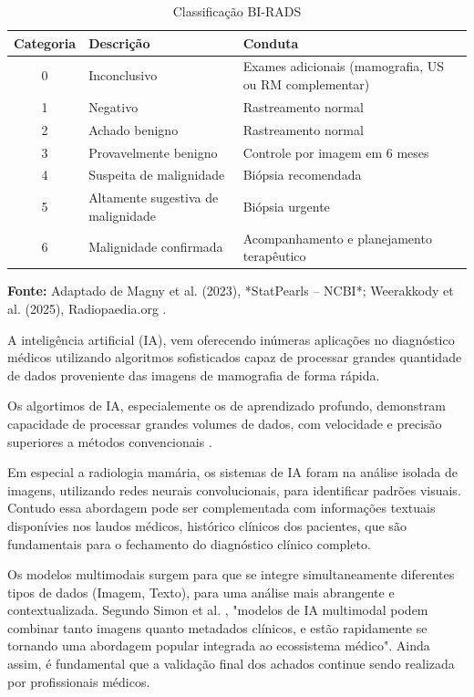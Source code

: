 \documentclass[12pt]{article}
\begin{document}
\begin{table}[!h]
\renewcommand{\arraystretch}{1.3}
\caption{Classificação BI-RADS}
\label{table:birads}
\centering
\begin{tabular}{|c|p{5cm}|p{8cm}|}
\hline
\textbf{Categoria} & \textbf{Descrição} & \textbf{Conduta} \\
\hline
0 & Inconclusivo & Exames adicionais (mamografia, US ou RM complementar) \\
\hline
1 & Negativo & Rastreamento normal \\
\hline
2 & Achado benigno & Rastreamento normal \\
\hline
3 & Provavelmente benigno & Controle por imagem em 6 meses \\
\hline
4 & Suspeita de malignidade & Biópsia recomendada \\
\hline
5 & Altamente sugestiva de malignidade & Biópsia urgente \\
\hline
6 & Malignidade confirmada & Acompanhamento e planejamento terapêutico \\
\hline
\end{tabular}

\vspace{0.2cm}
\small \textbf{Fonte:} Adaptado de Magny et al. (2023), *StatPearls – NCBI*; Weerakkody et al. (2025), Radiopaedia.org \cite{weerakkody2025birads}.
\end{table}

A inteligência artificial (IA), vem oferecendo inúmeras aplicações no diagnóstico médicos utilizando algoritmos sofisticados capaz de processar grandes quantidade de dados proveniente das imagens de mamografia de forma rápida.

Os algortimos de IA, especialemente os de aprendizado profundo, demonstram capacidade de processar grandes volumes de dados, com velocidade e precisão superiores a métodos convencionais \cite{hosny2018ai}.

Em especial a radiologia mamária, os sistemas de IA foram na análise isolada de imagens, utilizando redes neurais convolucionais, para identificar padrões visuais. Contudo essa abordagem pode ser complementada com informações textuais disponívies nos laudos médicos, histórico clínicos dos pacientes, que são fundamentais para o fechamento do diagnóstico clínico completo.

Os modelos multimodais surgem para que se integre simultaneamente diferentes tipos de dados (Imagem, Texto), para uma análise mais abrangente e contextualizada. Segundo Simon et al. \cite{simon2025multimodal}, "modelos de IA multimodal podem combinar tanto imagens quanto metadados clínicos, e estão rapidamente se tornando uma abordagem popular integrada ao ecossistema médico". Ainda assim, é fundamental que a validação final dos achados continue sendo realizada por profissionais médicos.
\end{document}
